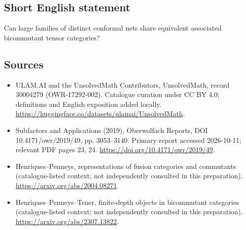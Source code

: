 \documentclass[11pt]{article}
\begin{document}
\subsection{Short English statement}
Can large families of distinct conformal nets share equivalent associated bicommutant tensor categories?
\subsection{Sources}
\begin{itemize}
\item[\hypertarget{source:30004279:1}{S1}] ULAM.AI and the UnsolvedMath Contributors, UnsolvedMath, record 30004279 (OWR-17292-002). Catalogue curation under CC BY 4.0; definitions and English exposition added locally.
\url{https://huggingface.co/datasets/ulamai/UnsolvedMath}.
\item[\hypertarget{source:30004279:2}{S2}] Subfactors and Applications (2019), Oberwolfach Reports, DOI 10.4171/owr/2019/49, pp. 3053--3140. Primary report accessed 2026-10-11; relevant PDF pages 23, 24.
\url{https://doi.org/10.4171/owr/2019/49}.
\item[\hypertarget{source:30004279:3}{S3}] Henriques--Penneys, representations of fusion categories and commutants (catalogue-listed context; not independently consulted in this preparation).
\url{https://arxiv.org/abs/2004.08271}.
\item[\hypertarget{source:30004279:4}{S4}] Henriques--Penneys--Tener, finite-depth objects in bicommutant categories (catalogue-listed context; not independently consulted in this preparation).
\url{https://arxiv.org/abs/2307.13822}.
\end{itemize}
\label{end:30004279}
\end{document}
